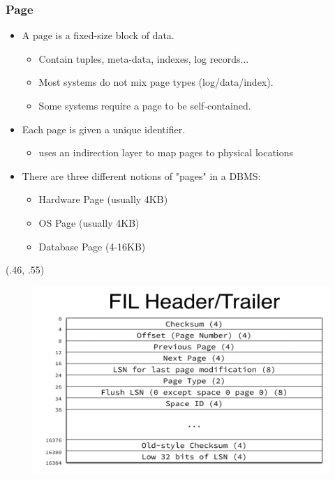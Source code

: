 \begin{frame}[fragile]
	\frametitle{Page}
	\begin{itemize}
		\item A page is a {\color{blue}fixed-size} block of data.
		\begin{itemize}
			\item Contain tuples, meta-data, indexes, log records...
			\item Most systems do not mix page types (log/data/index).
			\item Some systems require a page to be {\color{blue}self-contained}.
		\end{itemize}
		\item Each page is given a {\color{blue}unique identifier}.
		\begin{itemize}
			\item uses an indirection layer to map pages to physical locations
		\end{itemize}
		\item There are three different notions of "pages" in a DBMS:
		\begin{itemize}
			\item Hardware Page (usually 4KB)
			\item OS Page (usually 4KB)
			\item Database Page (4-16KB)
		\end{itemize}
	\end{itemize}
	\begin{textblock*}{.75\paperwidth}(.46\paperwidth, .55\paperheight) %
		\begin{figure}
			\includegraphics[width=.4\linewidth]{figs/dbfile-fil.png}
		\end{figure}
	\end{textblock*}

\end{frame}



